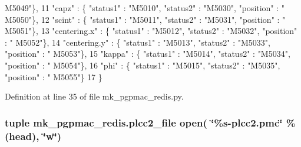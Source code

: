 \begin{DoxyCode}
{      M5049"}\},
11     \textcolor{stringliteral}{"capz"}        : \{ \textcolor{stringliteral}{"status1"} : \textcolor{stringliteral}{"M5010"}, \textcolor{stringliteral}{"status2"} : \textcolor{stringliteral}{"M5030"}, \textcolor{stringliteral}{"position"} : \textcolor{stringliteral}{"
      M5050"}\},
12     \textcolor{stringliteral}{"scint"}       : \{ \textcolor{stringliteral}{"status1"} : \textcolor{stringliteral}{"M5011"}, \textcolor{stringliteral}{"status2"} : \textcolor{stringliteral}{"M5031"}, \textcolor{stringliteral}{"position"} : \textcolor{stringliteral}{"
      M5051"}\},
13     \textcolor{stringliteral}{"centering.x"} : \{ \textcolor{stringliteral}{"status1"} : \textcolor{stringliteral}{"M5012"}, \textcolor{stringliteral}{"status2"} : \textcolor{stringliteral}{"M5032"}, \textcolor{stringliteral}{"position"} : \textcolor{stringliteral}{"
      M5052"}\},
14     \textcolor{stringliteral}{"centering.y"} : \{ \textcolor{stringliteral}{"status1"} : \textcolor{stringliteral}{"M5013"}, \textcolor{stringliteral}{"status2"} : \textcolor{stringliteral}{"M5033"}, \textcolor{stringliteral}{"position"} : \textcolor{stringliteral}{"
      M5053"}\},
15     \textcolor{stringliteral}{"kappa"}       : \{ \textcolor{stringliteral}{"status1"} : \textcolor{stringliteral}{"M5014"}, \textcolor{stringliteral}{"status2"} : \textcolor{stringliteral}{"M5034"}, \textcolor{stringliteral}{"position"} : \textcolor{stringliteral}{"
      M5054"}\},
16     \textcolor{stringliteral}{"phi"}         : \{ \textcolor{stringliteral}{"status1"} : \textcolor{stringliteral}{"M5015"}, \textcolor{stringliteral}{"status2"} : \textcolor{stringliteral}{"M5035"}, \textcolor{stringliteral}{"position"} : \textcolor{stringliteral}{"
      M5055"}\}
17 \}
\end{DoxyCode}


Definition at line 35 of file mk\-\_\-pgpmac\-\_\-redis.\-py.

\hypertarget{namespacemk__pgpmac__redis_a950307aae727f0afc8120ab03445b411}{
\subsubsection[{plcc2\-\_\-file}]{\setlength{\rightskip}{0pt plus 5cm}tuple mk\-\_\-pgpmac\-\_\-redis.\-plcc2\-\_\-file open( \char`\"{}\%s-\/plcc2.\-pmc\char`\"{} \% (head), \char`\"{}w\char`\"{})}}\label{namespacemk__pgpmac__redis_a950307aae727f0afc8120ab03445b411}


